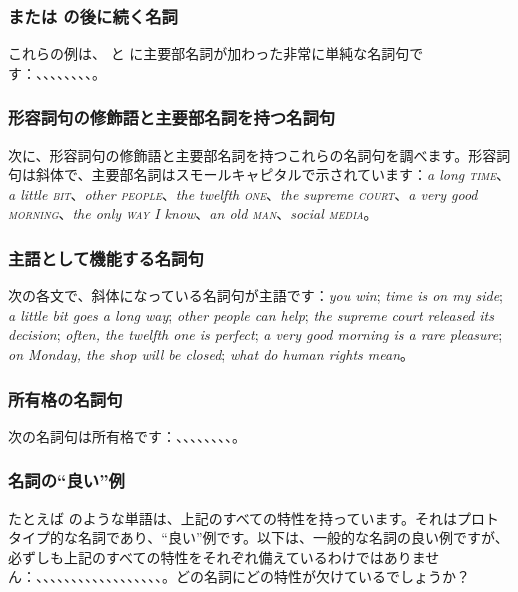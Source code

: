 \subsubsection*{ または  の後に続く名詞}
これらの例は、 と  に主要部名詞が加わった非常に単純な名詞句です：、、、、、、、、。

\subsubsection*{形容詞句の修飾語と主要部名詞を持つ名詞句}
次に、形容詞句の修飾語と主要部名詞を持つこれらの名詞句を調べます。形容詞句は斜体で、主要部名詞はスモールキャピタルで示されています：\textit{a \emph{long} \textsc{time}}、\textit{a \emph{little} \textsc{bit}}、\textit{\emph{other} \textsc{people}}、\textit{the \emph{twelfth} \textsc{one}}、\textit{the \emph{supreme} \textsc{court}}、\textit{a \emph{very good} \textsc{morning}}、\textit{the \emph{only} \textsc{way} I know}、\textit{an \emph{old} \textsc{man}}、\textit{\emph{social} \textsc{media}}。

\subsubsection*{主語として機能する名詞句}
次の各文で、斜体になっている名詞句が主語です：\textit{\emph{you} win}; \textit{\emph{time} is on my side}; \textit{\emph{a little bit} goes a long way}; \textit{\emph{other people} can help}; \textit{\emph{the supreme court} released its decision}; \textit{often, \emph{the twelfth one} is perfect}; \textit{\emph{a very good morning} is a rare pleasure}; \textit{on Monday, \emph{the shop} will be closed}; \textit{what do \emph{human rights} mean}。


\subsubsection*{所有格の名詞句}
次の名詞句は所有格です：、、、、、、、、。

\subsubsection*{名詞の\enquote{良い}例}
たとえば  のような単語は、上記のすべての特性を持っています。それはプロトタイプ的な名詞であり、\enquote{良い}例です。以下は、一般的な名詞の良い例ですが、必ずしも上記のすべての特性をそれぞれ備えているわけではありません：、、、、、、、、、、、、、、、、、、。どの名詞にどの特性が欠けているでしょうか？


